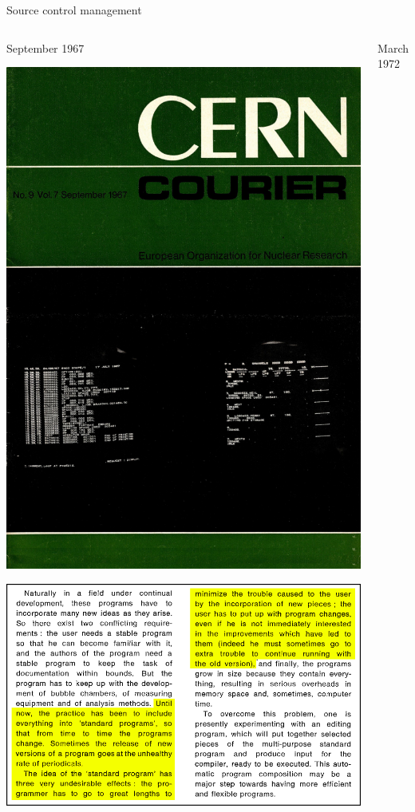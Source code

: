 \documentclass[aspectratio=169]{beamer}
\begin{document}
\begin{frame}{Source control management}
\large
\begin{columns}
\begin{center}
September 1967

\vspace{0.2 cm}
\includegraphics[width=0.55\linewidth]{PLOTS/cern-courier-1.png}

\vspace{-5 cm}
\mbox{\hspace{0.5 cm}\includegraphics[height=5.5 cm]{PLOTS/patchy-1.png}}
\end{center}

\begin{center}
March 1972


\end{center}
\end{columns}
\end{frame}
\end{document}
